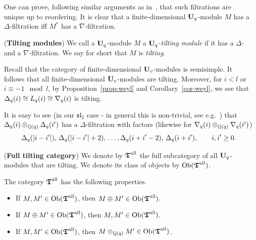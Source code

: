 One can prove, following similar arguments as in~\cite[Proposition~II.4.16]{jarag},
that such filtrations are unique up to reordering. It is clear that 
a finite-dimensional $\boldsymbol{\mathrm{U}}_q$-module $M$ has a 
$\Delta$-filtration iff $M^*$ has a $\nabla$-filtration.



\begin{defn}(\textbf{Tilting modules})\label{defn-tilt}
We call a $\boldsymbol{\mathrm{U}}_q$-module $M$ a $\boldsymbol{\mathrm{U}}_q$-\textit{tilting module} 
if it has a $\Delta$- and a $\nabla$-filtration. 
We say for short that $M$ is \textit{tilting}.
\end{defn}




\begin{ex}\label{ex-tilt}
Recall that the category of finite-dimensional $\boldsymbol{\mathrm{U}}_v$-modules is 
semisimple. It follows that all finite-dimensional 
$\boldsymbol{\mathrm{U}}_v$-modules are tilting. Moreover, for $i<l$ or $i\equiv -1 \mod l$, 
by Proposition~\ref{prop-weyl} and 
Corollary~\ref{cor-weyl}, we see that $\Delta_q({i})\cong L_q({i})\cong\nabla_q({i})$ is tilting.
\end{ex}



It is easy to see 
(in our $\mathfrak{sl}_2$ case - in general this 
is non-trivial, see e.g.~\cite[Theorem~3.3]{par}) 
that $\Delta_q({i})\otimes_{\mathbb{Q}(q)}\Delta_q({i^{\prime}})$ has a $\Delta$-filtration with factors 
(likewise for $\nabla_q({i})\otimes_{\mathbb{Q}(q)}\nabla_q({i^{\prime}})$)
\begin{equation}\label{eq-tiltfact}
\Delta_q({|i-i^{\prime}|}),\,\Delta_q({|i-i^{\prime}|+2}),\,\dots, \Delta_q({i+i^{\prime}-2}),\,\Delta_q({i+i^{\prime}}),\quad\quad i,i^{\prime}\geq 0.
\end{equation}



\begin{defn}(\textbf{Full tilting category})\label{defn-ftiltcat}
We denote by $\boldsymbol{\mathfrak{T}}^{\mathrm{all}}$ the full 
subcategory of all $\boldsymbol{\mathrm{U}}_q$-modules that are tilting. 
We denote its class of objects by $\mathrm{Ob}(\boldsymbol{\mathfrak{T}}^{\mathrm{all}})$.
\end{defn}



\begin{prop}\label{prop-basicp}
The category $\boldsymbol{\mathfrak{T}}^{\mathrm{all}}$ has the following properties.
\begin{itemize}
\item[(a)] If $M,M^{\prime}\in\mathrm{Ob}(\boldsymbol{\mathfrak{T}}^{\mathrm{all}})$, then $M\oplus M^{\prime}\in\mathrm{Ob}(\boldsymbol{\mathfrak{T}}^{\mathrm{all}})$.
\item[(b)] If $M\oplus M^{\prime}\in\mathrm{Ob}(\boldsymbol{\mathfrak{T}}^{\mathrm{all}})$, then $M,M^{\prime}\in\mathrm{Ob}(\boldsymbol{\mathfrak{T}}^{\mathrm{all}})$.
\item[(c)] If $M,M^{\prime}\in\mathrm{Ob}(\boldsymbol{\mathfrak{T}}^{\mathrm{all}})$, then $M\otimes_{\mathbb{Q}(q)} M^{\prime}\in\mathrm{Ob}(\boldsymbol{\mathfrak{T}}^{\mathrm{all}})$.\makeqed
\end{itemize}
\end{prop}



